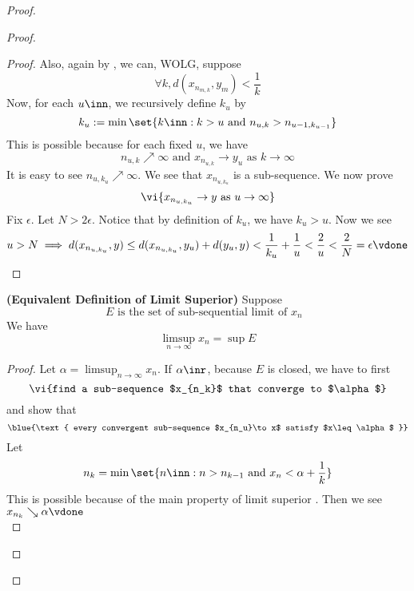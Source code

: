 \documentclass{report}
\begin{document}
\begin{proof}
\begin{proof}
\begin{proof}
Also, again by , we can, WOLG, suppose 
\begin{equation*}
\forall k,d(x_{n_{m,k}},y_m)<\frac{1}{k}
\end{equation*}
Now, for each $u\inn$, we recursively define $k_u$ by
\begin{equation*}
k_u:=\min \set{k\inn:k>u\text{ and }n_{u,k}>n_{u-1,k_{u-1}}}
\end{equation*}
This is possible because for each fixed  $u$, we have 
\begin{equation*}
n_{u,k}\nearrow \infty\text{ and }x_{n_{u,k}}\to y_u\text{ as }k\to\infty
\end{equation*}
It is easy to see $n_{u,k_u}\nearrow \infty$. We see that $x_{n_{u,k_u}}$ is a sub-sequence. We now prove 
\begin{equation*}
  \vi{x_{n_{u,k_u}}\to y\text{ as }u\to \infty} 
\end{equation*}
Fix $\epsilon $. Let $N>2\epsilon $. Notice that by definition of $k_u$, we have  $k_u>u$. Now we see 
\begin{equation*}
u>N\implies d(x_{n_{u,k_u}},y)\leq d(x_{n_{u,k_u}},y_u)+d(y_u,y)<\frac{1}{k_u}+\frac{1}{u}<\frac{2}{u}<\frac{2}{N}=\epsilon \vdone
\end{equation*}
\end{proof}
\begin{theorem}
\label{4.4.10}
\textbf{(Equivalent Definition of Limit Superior)} Suppose 
\begin{equation*}
E\text{ is the set of sub-sequential limit of $x_n$ }
\end{equation*}
We have 
\begin{equation*}
\limsup_{n\to\infty} x_n=\sup E
\end{equation*}
\end{theorem}
\begin{proof}
Let $\alpha =\limsup_{n\to\infty} x_n$. If $\alpha \inr$, because $E$ is closed, we have to first
  \begin{equation*}
  \text{ \vi{find a sub-sequence $x_{n_k}$ that converge to $\alpha $} }
  \end{equation*}
and show that 
\begin{equation*}
  \blue{\text{ every convergent sub-sequence $x_{n_u}\to x$ satisfy $x\leq \alpha $ }}
\end{equation*}
Let 
\begin{equation*}
n_k=\min \set{n\inn:n>n_{k-1}\text{ and }x_{n}<\alpha +\frac{1}{k}}
\end{equation*}
This is possible because of the main property of limit superior . Then we see $x_{n_k}\searrow \alpha \vdone$\\


\end{proof}
\end{proof}
\end{proof}
\end{document}
